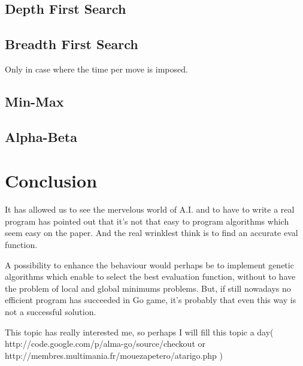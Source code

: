 \documentclass{book}
\begin{document}
\section{Depth First Search}
\section{Breadth First Search}
Only in case where the time per move is imposed.
\section{Min-Max}
\section{Alpha-Beta}



\chapter{Conclusion}
It has allowed us to see the mervelous world of A.I. and to have to write a real program has pointed out that it's not that easy to program algorithms which seem easy on the paper.
And the real wrinklest think is to find an accurate eval function.

A possibility to enhance the behaviour would perhaps be to
 implement genetic algorithms which enable to
select the best evaluation function, without 
to have the problem of local and global 
minimums problems. But, if still nowadays no efficient program has succeeded in Go game, it's probably that even this way is not a successful solution.

This topic has really interested me, so perhaps I will fill this topic a
day(  http://code.google.com/p/alma-go/source/checkout or 
http://membres.multimania.fr/mouezapetero/atarigo.php  )
\end{document}
